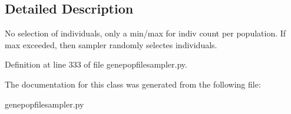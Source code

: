 \subsection{Detailed Description}
\begin{DoxyVerb}No selection of individuals, only a min/max for indiv count
per population.  If max exceeded, then sampler randomly 
selectes individuals.
\end{DoxyVerb}
 

Definition at line 333 of file genepopfilesampler.\+py.



The documentation for this class was generated from the following file\+:\begin{DoxyCompactItemize}
\item 
genepopfilesampler.\+py\end{DoxyCompactItemize}
